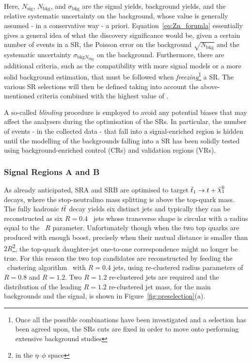 			\noindent Here, $N_\mathrm{sig}$, $N_\mathrm{bkg}$, and $\sigma_\mathrm{bkg}$ are the signal yields, background yields, and the relative systematic uncertainty on the background, whose value is generally assumed - in a conservative way - a priori. Equation~\ref{eq:Zn_forumla} essentially gives a general idea of what the discovery significance would be, given a certain number of events in a \ac{SR}, the Poisson error on the background $\sqrt{N_{\mathrm{bkg}}}$ and the systematic uncertainty $\sigma_{\mathrm{bkg}N_{\mathrm{bkg}}}$ on the background. Furthermore, there are additional criteria, such as the compatibility with more signal models or a more solid background estimation, that must be followed when \emph{freezing}\footnote{Once all the possible combinations have been investigated and a selection has been agreed upon, the \acp{SR} cuts are fixed in order to move onto performing extensive background studies} a \ac{SR}. The various \ac{SR} selections will then be defined taking into account the above-mentioned criteria combined with the highest value of \Zn. 

			A so-called \emph{blinding} procedure is employed to avoid any potential biases that may affect the analysers during the optimisation of the \acp{SR}. In particular, the number of events - in the collected data - that fall into a signal-enriched region is hidden until the modelling of the backgrounds falling into a \ac{SR} has been solidly tested using background-enriched control (\acp{CR}) and validation regions (\acp{VR}).%
			
			


			\subsubsection*{Signal Regions A and B}

				As already anticipated, SRA and SRB are optimised to target $\stopone \to t + \ninoone$ decays, where the stop-neutralino mass splitting is above the top-quark mass. The fully hadronic $t\bar{t}$ decay yields six distinct jets and typically they can be reconstructed as six $R=0.4$ \antikt\ jets whose transverse shape is circular with a radius equal to the \antikt\ $R$ parameter. Unfortunately though when the two top quarks are produced with enough boost, precisely when their mutual distance is smaller than $2R$\footnote{in the $\eta$--$\phi$ space}, the top-quark daughter-jet one-to-one correspondence might no longer be true. For this reason the two top candidates are reconstructed by feeding the \antikt\ clustering algorithm~\cite{Antikt2008} with $R=0.4$ jets, using re-clustered radius parameters of $R=0.8$ and $R=1.2$. Two $R=1.2$ re-clustered jets are required and the distribution of the leading $R=1.2$ re-clustered jet mass, for the main backgrounds and the signal, is shown in Figure~\ref{fig:preselection}(a).

